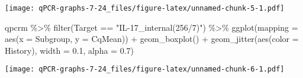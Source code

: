 \documentclass[
]{article}
\newenvironment{Shaded}{\begin{snugshade}}{\end{snugshade}}
\newcommand{\AttributeTok}[1]{\textcolor[rgb]{0.77,0.63,0.00}{#1}}
\newcommand{\FloatTok}[1]{\textcolor[rgb]{0.00,0.00,0.81}{#1}}
\newcommand{\FunctionTok}[1]{\textcolor[rgb]{0.00,0.00,0.00}{#1}}
\newcommand{\NormalTok}[1]{#1}
\newcommand{\SpecialCharTok}[1]{\textcolor[rgb]{0.00,0.00,0.00}{#1}}
\newcommand{\StringTok}[1]{\textcolor[rgb]{0.31,0.60,0.02}{#1}}
\begin{document}
\texttt{[image: qPCR-graphs-7-24\_files/figure-latex/unnamed-chunk-5-1.pdf]}

\begin{Shaded}
\begin{Highlighting}[]
\NormalTok{qpcrm }\SpecialCharTok{\%\textgreater{}\%}
  \FunctionTok{filter}\NormalTok{(Target }\SpecialCharTok{==} \StringTok{"IL{-}17\_internal(256/7)"}\NormalTok{) }\SpecialCharTok{\%\textgreater{}\%}
\FunctionTok{ggplot}\NormalTok{(}\AttributeTok{mapping =} \FunctionTok{aes}\NormalTok{(}\AttributeTok{x =}\NormalTok{ Subgroup, }\AttributeTok{y =}\NormalTok{ CqMean)) }\SpecialCharTok{+} 
  \FunctionTok{geom\_boxplot}\NormalTok{()  }\SpecialCharTok{+}
  \FunctionTok{geom\_jitter}\NormalTok{(}\FunctionTok{aes}\NormalTok{(}\AttributeTok{color =}\NormalTok{ History), }\AttributeTok{width =} \FloatTok{0.1}\NormalTok{, }\AttributeTok{alpha =} \FloatTok{0.7}\NormalTok{)}
\end{Highlighting}
\end{Shaded}

\texttt{[image: qPCR-graphs-7-24\_files/figure-latex/unnamed-chunk-6-1.pdf]}
\end{document}
